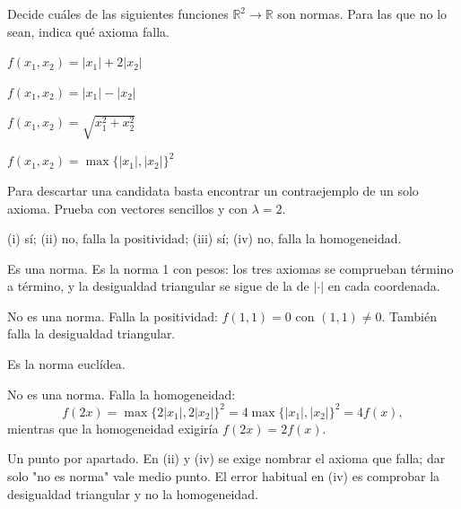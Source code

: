 %

\begin{exercise}
Decide cuáles de las siguientes funciones $\mathbb{R}^2 \to \mathbb{R}$ son
normas. Para las que no lo sean, indica qué axioma falla.

\begin{parts}
  \item $f(x_1, x_2) = |x_1| + 2|x_2|$
  \item $f(x_1, x_2) = |x_1| - |x_2|$
  \item $f(x_1, x_2) = \sqrt{x_1^2 + x_2^2}$
  \item $f(x_1, x_2) = \max\{|x_1|, |x_2|\}^2$
\end{parts}


\begin{hint}
Para descartar una candidata basta encontrar un contraejemplo de un solo
axioma. Prueba con vectores sencillos y con $\lambda = 2$.
\end{hint}

\begin{answer}
(i) sí; (ii) no, falla la positividad; (iii) sí; (iv) no, falla la homogeneidad.
\end{answer}

\begin{solution}
\begin{parts}
  \item Es una norma. Es la norma 1 con pesos: los tres axiomas se comprueban
        término a término, y la desigualdad triangular se sigue de la de
        $|\cdot|$ en cada coordenada.
  \item No es una norma. Falla la positividad: $f(1,1) = 0$ con $(1,1) \neq 0$.
        También falla la desigualdad triangular.
  \item Es la norma euclídea.
  \item No es una norma. Falla la homogeneidad:
        \[
          f(2x) = \max\{2|x_1|, 2|x_2|\}^2 = 4\max\{|x_1|,|x_2|\}^2 = 4 f(x),
        \]
        mientras que la homogeneidad exigiría $f(2x) = 2 f(x)$.
\end{parts}
\end{solution}

\begin{marking}
Un punto por apartado. En (ii) y (iv) se exige nombrar el axioma que falla; dar
solo "no es norma" vale medio punto. El error habitual en (iv) es comprobar la
desigualdad triangular y no la homogeneidad.
\end{marking}
\end{exercise}

